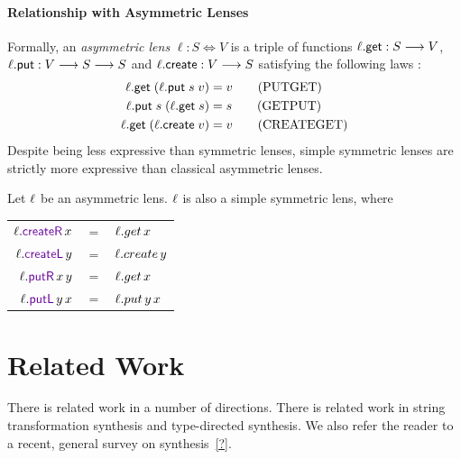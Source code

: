 \documentclass[acmsmall,screen,anonymous]{acmart}
\begin{document}
\paragraph*{Relationship with Asymmetric Lenses}
Formally, an {\em asymmetric lens} $ \ell : S \Leftrightarrow V$ is a triple of functions $\ell.\mathsf{get} : S \longrightarrow V$, $\ell.\mathsf{put} : V \longrightarrow S \longrightarrow S$ and $\ell.\mathsf{create} : V \longrightarrow S$ satisfying the following laws \cite{Focal2005-long2}:
\begin{align*}
\ell.\mathsf{get} \; (\ell.\mathsf{put} \; s \; v) &= v \tag{PUTGET}\\
\ell.\mathsf{put} \; s \; (\ell.\mathsf{get} \; s) &= s \tag{GETPUT}\\
\ell.\mathsf{get} \; (\ell.\mathsf{create} \; v) &= v \tag{CREATEGET}
\end{align*}
Despite being less expressive than symmetric lenses, simple symmetric lenses are
strictly more expressive than classical asymmetric lenses.

\begin{theorem}
  Let $\mathit{\ell}$ be an asymmetric lens. $\mathit{\ell}$ is also a simple symmetric lens,
  where
  \begin{center}
    \begin{tabular}{rcl}
      $\Lens.\CreateROf{x}$ & $=$ & $\mathit{\ell}.get \, x$\\
      $\Lens.\CreateLOf{y}$ & $=$ & $\mathit{\ell}.create \, y$\\
      $\Lens.\PutROf{x}{y}$ & $=$ & $\mathit{\ell}.get \, x$\\
      $\Lens.\PutLOf{y}{x}$ & $=$ & $\mathit{\ell}.put \, y \, x$
    \end{tabular}
  \end{center}
\end{theorem}


\section{Related Work}
\label{sec:related}
There is related work in a number of directions. There is related work in string
transformation synthesis and type-directed synthesis. We also refer the reader
to a recent, general survey on synthesis~\ref{?}.
\end{document}
